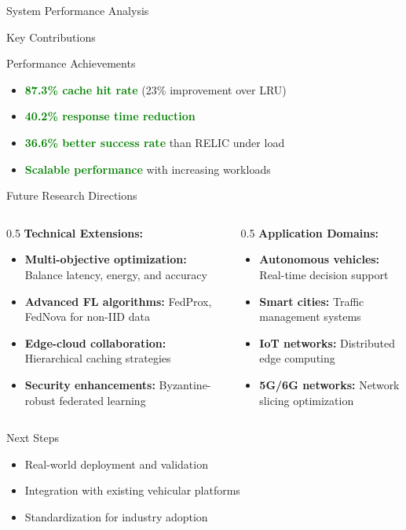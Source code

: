\documentclass[aspectratio=169]{beamer}
\begin{document}
\begin{frame}{System Performance Analysis}
\begin{frame}{Key Contributions}
\begin{block}{Performance Achievements}
\begin{itemize}
\item \textcolor{green}{\textbf{87.3\% cache hit rate}} (23\% improvement over LRU)
\item \textcolor{green}{\textbf{40.2\% response time reduction}}
\item \textcolor{green}{\textbf{36.6\% better success rate}} than RELIC under load
\item \textcolor{green}{\textbf{Scalable performance}} with increasing workloads
\end{itemize}
\end{block}
\end{frame}

\begin{frame}{Future Research Directions}
\begin{columns}
\begin{column}{0.5\textwidth}
\textbf{Technical Extensions:}
\begin{itemize}
\item \textbf{Multi-objective optimization:} Balance latency, energy, and accuracy
\item \textbf{Advanced FL algorithms:} FedProx, FedNova for non-IID data
\item \textbf{Edge-cloud collaboration:} Hierarchical caching strategies
\item \textbf{Security enhancements:} Byzantine-robust federated learning
\end{itemize}
\end{column}
\begin{column}{0.5\textwidth}
\textbf{Application Domains:}
\begin{itemize}
\item \textbf{Autonomous vehicles:} Real-time decision support
\item \textbf{Smart cities:} Traffic management systems
\item \textbf{IoT networks:} Distributed edge computing
\item \textbf{5G/6G networks:} Network slicing optimization
\end{itemize}
\end{column}
\end{columns}

\begin{alertblock}{Next Steps}
\begin{itemize}
\item Real-world deployment and validation
\item Integration with existing vehicular platforms
\item Standardization for industry adoption
\end{itemize}
\end{alertblock}
\end{frame}


\end{frame}
\end{document}
